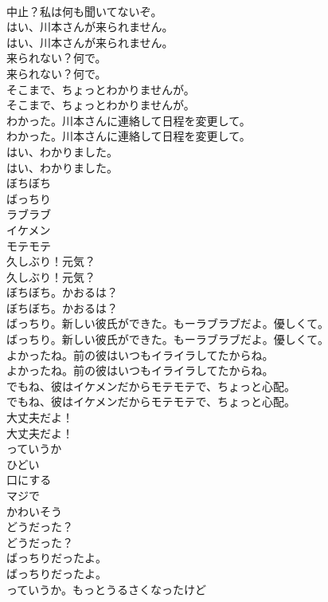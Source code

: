 \documentclass[8pt]{extreport}
\begin{document}
\begin{CJK}{UTF8}{min}
\\	中止？私は何も聞いてないぞ。 
\\	はい、川本さんが来られません。	
\\	はい、川本さんが来られません。 
\\	来られない？何で。	
\\	来られない？何で。 
\\	そこまで、ちょっとわかりませんが。	
\\	そこまで、ちょっとわかりませんが。 
\\	わかった。川本さんに連絡して日程を変更して。	
\\	わかった。川本さんに連絡して日程を変更して。 
\\	はい、わかりました。	
\\	はい、わかりました。 
\\	ぼちぼち
\\	ばっちり
\\	ラブラブ
\\	イケメン
\\	モテモテ
\\	久しぶり！元気？	
\\	久しぶり！元気？ 
\\	ぼちぼち。かおるは？	
\\	ぼちぼち。かおるは？ 
\\	ばっちり。新しい彼氏ができた。もーラブラブだよ。優しくて。	
\\	ばっちり。新しい彼氏ができた。もーラブラブだよ。優しくて。 
\\	よかったね。前の彼はいつもイライラしてたからね。	
\\	よかったね。前の彼はいつもイライラしてたからね。 
\\	でもね、彼はイケメンだからモテモテで、ちょっと心配。	
\\	でもね、彼はイケメンだからモテモテで、ちょっと心配。 
\\	大丈夫だよ！	
\\	大丈夫だよ！ 
\\	っていうか
\\	ひどい
\\	口にする
\\	マジで
\\	かわいそう
\\	どうだった？	
\\	どうだった？ 
\\	ばっちりだったよ。	
\\	ばっちりだったよ。 
\\	っていうか。もっとうるさくなったけど

\end{CJK}
\end{document}
